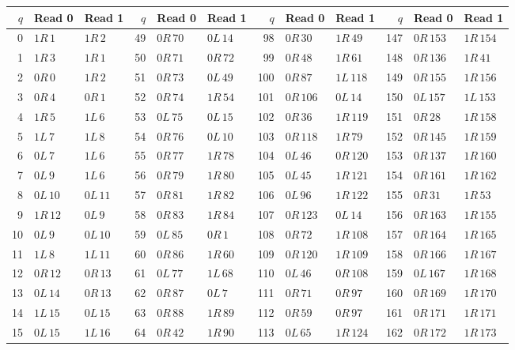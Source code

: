 \begin{longtable}{@{}rll@{\quad}rll@{\quad}rll@{\quad}rll@{}}
\toprule $q$ & Read 0 & Read 1 & $q$ & Read 0 & Read 1 & $q$ & Read 0 & Read 1 & $q$ & Read 0 & Read 1 \\ \midrule\endhead
0 & $1R\,1$ & $1R\,2$ & 49 & $0R\,70$ & $0L\,14$ & 98 & $0R\,30$ & $1R\,49$ & 147 & $0R\,153$ & $1R\,154$\\
1 & $1R\,3$ & $1R\,1$ & 50 & $0R\,71$ & $0R\,72$ & 99 & $0R\,48$ & $1R\,61$ & 148 & $0R\,136$ & $1R\,41$\\
2 & $0R\,0$ & $1R\,2$ & 51 & $0R\,73$ & $0L\,49$ & 100 & $0R\,87$ & $1L\,118$ & 149 & $0R\,155$ & $1R\,156$\\
3 & $0R\,4$ & $0R\,1$ & 52 & $0R\,74$ & $1R\,54$ & 101 & $0R\,106$ & $0L\,14$ & 150 & $0L\,157$ & $1L\,153$\\
4 & $1R\,5$ & $1L\,6$ & 53 & $0L\,75$ & $0L\,15$ & 102 & $0R\,36$ & $1R\,119$ & 151 & $0R\,28$ & $1R\,158$\\
5 & $1L\,7$ & $1L\,8$ & 54 & $0R\,76$ & $0L\,10$ & 103 & $0R\,118$ & $1R\,79$ & 152 & $0R\,145$ & $1R\,159$\\
6 & $0L\,7$ & $1L\,6$ & 55 & $0R\,77$ & $1R\,78$ & 104 & $0L\,46$ & $0R\,120$ & 153 & $0R\,137$ & $1R\,160$\\
7 & $0L\,9$ & $1L\,6$ & 56 & $0R\,79$ & $1R\,80$ & 105 & $0L\,45$ & $1R\,121$ & 154 & $0R\,161$ & $1R\,162$\\
8 & $0L\,10$ & $0L\,11$ & 57 & $0R\,81$ & $1R\,82$ & 106 & $0L\,96$ & $1R\,122$ & 155 & $0R\,31$ & $1R\,53$\\
9 & $1R\,12$ & $0L\,9$ & 58 & $0R\,83$ & $1R\,84$ & 107 & $0R\,123$ & $0L\,14$ & 156 & $0R\,163$ & $1R\,155$\\
10 & $0L\,9$ & $0L\,10$ & 59 & $0L\,85$ & $0R\,1$ & 108 & $0R\,72$ & $1R\,108$ & 157 & $0R\,164$ & $1R\,165$\\
11 & $1L\,8$ & $1L\,11$ & 60 & $0R\,86$ & $1R\,60$ & 109 & $0R\,120$ & $1R\,109$ & 158 & $0R\,166$ & $1R\,167$\\
12 & $0R\,12$ & $0R\,13$ & 61 & $0L\,77$ & $1L\,68$ & 110 & $0L\,46$ & $0R\,108$ & 159 & $0L\,167$ & $1R\,168$\\
13 & $0L\,14$ & $0R\,13$ & 62 & $0R\,87$ & $0L\,7$ & 111 & $0R\,71$ & $0R\,97$ & 160 & $0R\,169$ & $1R\,170$\\
14 & $1L\,15$ & $0L\,15$ & 63 & $0R\,88$ & $1R\,89$ & 112 & $0R\,59$ & $0R\,97$ & 161 & $0R\,171$ & $1R\,171$\\
15 & $0L\,15$ & $1L\,16$ & 64 & $0R\,42$ & $1R\,90$ & 113 & $0L\,65$ & $1R\,124$ & 162 & $0R\,172$ & $1R\,173$\\

\end{longtable}
